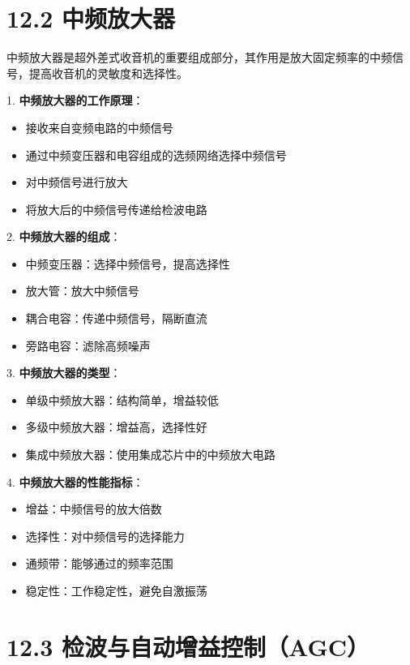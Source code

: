 \documentclass[12pt,UTF8]{ctexbook}
\begin{document}
\section*{12.2 中频放大器}

中频放大器是超外差式收音机的重要组成部分，其作用是放大固定频率的中频信号，提高收音机的灵敏度和选择性。

1. \textbf{中频放大器的工作原理}：
   \begin{itemize}[leftmargin=3.5em]
   \item 接收来自变频电路的中频信号
   \item 通过中频变压器和电容组成的选频网络选择中频信号
   \item 对中频信号进行放大
   \item 将放大后的中频信号传递给检波电路
   \end{itemize}

2. \textbf{中频放大器的组成}：
   \begin{itemize}[leftmargin=3.5em]
   \item 中频变压器：选择中频信号，提高选择性
   \item 放大管：放大中频信号
   \item 耦合电容：传递中频信号，隔断直流
   \item 旁路电容：滤除高频噪声
   \end{itemize}

3. \textbf{中频放大器的类型}：
   \begin{itemize}[leftmargin=3.5em]
   \item 单级中频放大器：结构简单，增益较低
   \item 多级中频放大器：增益高，选择性好
   \item 集成中频放大器：使用集成芯片中的中频放大电路
   \end{itemize}

4. \textbf{中频放大器的性能指标}：
   \begin{itemize}[leftmargin=3.5em]
   \item 增益：中频信号的放大倍数
   \item 选择性：对中频信号的选择能力
   \item 通频带：能够通过的频率范围
   \item 稳定性：工作稳定性，避免自激振荡
   \end{itemize}

\section*{12.3 检波与自动增益控制（AGC）}
\end{document}
